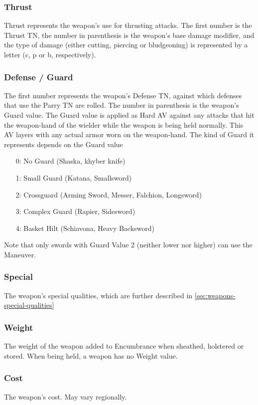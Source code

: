 \documentclass[oneside,11pt,english]{book}
\begin{document}
\subsubsection{Thrust}
Thrust represents the weapon’s use for thrusting attacks. The first number is the Thrust TN, the number in parenthesis 
is the weapon’s base damage modifier, and the type of damage (either cutting, piercing or bludgeoning) is represented 
by a letter (c, p or b, respectively). 
\subsubsection{Defense / Guard}
The first number represents the weapon’s Defense TN, against which defenses that use the Parry TN are rolled. The 
number in parenthesis is the weapon’s Guard value. The Guard value is applied as Hard AV against any attacks that hit
the weapon-hand of the wielder while the weapon is being held normally. This AV layers with any actual armor worn 
on the weapon-hand. The kind of Guard it represents depends on the Guard value
\begin{itemize}
	\item [0:] No Guard (Shaska, khyber knife)
	\item [1:] Small Guard (Katana, Smallsword)
	\item [2:] Crossguard (Arming Sword, Messer, Falchion, Longsword)
	\item [3:] Complex Guard (Rapier, Sidesword)
	\item [4:] Basket Hilt (Schiavona, Heavy Backsword)
\end{itemize}
Note that only swords with Guard Value 2 (neither lower nor higher) can use the  Maneuver.
\subsubsection{Special}
The weapon’s special qualities, which are further described in \autoref{sec:weapons-special-qualities}
\subsubsection{Weight}
The weight of the weapon added to Encumbrance when sheathed, holstered or stored. When being held, a weapon has 
no Weight value.
\subsubsection{Cost}
The weapon’s cost. May vary regionally.
\end{document}

